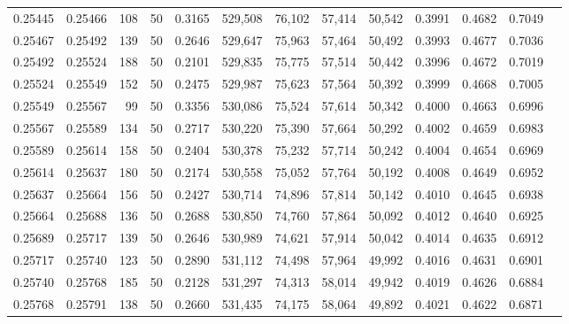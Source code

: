 \begin{tabular}{rrrrrrrrrrrrr}
0.25445 & 0.25466 &   108 &  50 &                                     0.3165 & 529,508 &  76,102 &  57,414 &  50,542 & 0.3991 & 0.4682 & 0.7049 \\
0.25467 & 0.25492 &   139 &  50 &                                     0.2646 & 529,647 &  75,963 &  57,464 &  50,492 & 0.3993 & 0.4677 & 0.7036 \\
0.25492 & 0.25524 &   188 &  50 &                                     0.2101 & 529,835 &  75,775 &  57,514 &  50,442 & 0.3996 & 0.4672 & 0.7019 \\
0.25524 & 0.25549 &   152 &  50 &                                     0.2475 & 529,987 &  75,623 &  57,564 &  50,392 & 0.3999 & 0.4668 & 0.7005 \\
0.25549 & 0.25567 &    99 &  50 &                                     0.3356 & 530,086 &  75,524 &  57,614 &  50,342 & 0.4000 & 0.4663 & 0.6996 \\
0.25567 & 0.25589 &   134 &  50 &                                     0.2717 & 530,220 &  75,390 &  57,664 &  50,292 & 0.4002 & 0.4659 & 0.6983 \\
0.25589 & 0.25614 &   158 &  50 &                                     0.2404 & 530,378 &  75,232 &  57,714 &  50,242 & 0.4004 & 0.4654 & 0.6969 \\
0.25614 & 0.25637 &   180 &  50 &                                     0.2174 & 530,558 &  75,052 &  57,764 &  50,192 & 0.4008 & 0.4649 & 0.6952 \\
0.25637 & 0.25664 &   156 &  50 &                                     0.2427 & 530,714 &  74,896 &  57,814 &  50,142 & 0.4010 & 0.4645 & 0.6938 \\
0.25664 & 0.25688 &   136 &  50 &                                     0.2688 & 530,850 &  74,760 &  57,864 &  50,092 & 0.4012 & 0.4640 & 0.6925 \\
0.25689 & 0.25717 &   139 &  50 &                                     0.2646 & 530,989 &  74,621 &  57,914 &  50,042 & 0.4014 & 0.4635 & 0.6912 \\
0.25717 & 0.25740 &   123 &  50 &                                     0.2890 & 531,112 &  74,498 &  57,964 &  49,992 & 0.4016 & 0.4631 & 0.6901 \\
0.25740 & 0.25768 &   185 &  50 &                                     0.2128 & 531,297 &  74,313 &  58,014 &  49,942 & 0.4019 & 0.4626 & 0.6884 \\
0.25768 & 0.25791 &   138 &  50 &                                     0.2660 & 531,435 &  74,175 &  58,064 &  49,892 & 0.4021 & 0.4622 & 0.6871 \\

\end{tabular}
